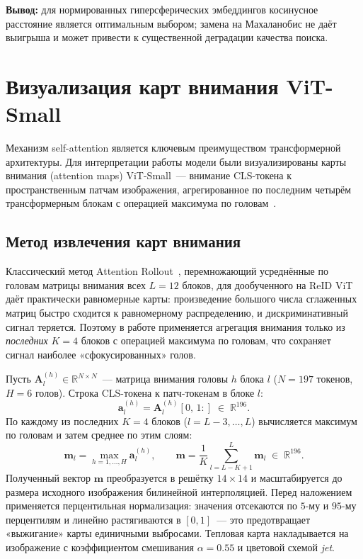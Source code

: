 \textbf{Вывод:} для нормированных гиперсферических эмбеддингов косинусное расстояние
является оптимальным выбором; замена на Махаланобис не даёт выигрыша и может привести
к существенной деградации качества поиска.

\section{Визуализация карт внимания ViT-Small}

Механизм self-attention является ключевым преимуществом трансформерной архитектуры.
Для интерпретации работы модели были визуализированы карты внимания (attention maps)
ViT-Small~--- внимание CLS-токена к пространственным патчам изображения,
агрегированное по последним четырём трансформерным блокам с операцией максимума
по головам~\cite{dosovitskiy2020image}.

\subsection{Метод извлечения карт внимания}

Классический метод Attention Rollout~\cite{abnar2020quantifying},
перемножающий усреднённые по головам матрицы внимания всех $L=12$ блоков,
для дообученного на ReID ViT даёт практически равномерные карты:
произведение большого числа сглаженных матриц быстро сходится к равномерному
распределению, и дискриминативный сигнал теряется. Поэтому в работе применяется
агрегация внимания только из \emph{последних} $K=4$ блоков с операцией максимума
по головам, что сохраняет сигнал наиболее «сфокусированных» голов.

Пусть $\mathbf{A}_l^{(h)} \in \mathbb{R}^{N \times N}$~--- матрица внимания
головы $h$ блока $l$ ($N = 197$ токенов, $H = 6$ голов). Строка CLS-токена
к патч-токенам в блоке $l$:
\[
  \mathbf{a}_l^{(h)} = \mathbf{A}_l^{(h)}[0,\,1{:}] \;\in\; \mathbb{R}^{196}.
\]
По каждому из последних $K = 4$ блоков ($l = L-3, \dots, L$) вычисляется
максимум по головам и затем среднее по этим слоям:
\[
  \mathbf{m}_l = \max_{h=1,\dots,H} \mathbf{a}_l^{(h)},
  \qquad
  \mathbf{m} = \frac{1}{K}\sum_{l=L-K+1}^{L} \mathbf{m}_l \;\in\; \mathbb{R}^{196}.
\]
Полученный вектор $\mathbf{m}$ преобразуется в решётку $14 \times 14$ и
масштабируется до размера исходного изображения билинейной интерполяцией.
Перед наложением применяется перцентильная нормализация: значения отсекаются
по $5$-му и $95$-му перцентилям и линейно растягиваются в $[0,1]$~--- это
предотвращает «выжигание» карты единичными выбросами. Тепловая карта
накладывается на изображение с коэффициентом смешивания $\alpha = 0.55$
и цветовой схемой \emph{jet}.

